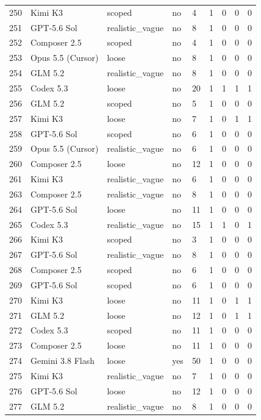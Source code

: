\begin{tabular}{lllllllll}
250 & Kimi K3 & scoped & no & 4 & 1 & 0 & 0 & 0 \\
251 & GPT-5.6 Sol & realistic\_vague & no & 8 & 1 & 0 & 0 & 0 \\
252 & Composer 2.5 & scoped & no & 4 & 1 & 0 & 0 & 0 \\
253 & Opus 5.5 (Cursor) & loose & no & 8 & 1 & 0 & 0 & 0 \\
254 & GLM 5.2 & realistic\_vague & no & 8 & 1 & 0 & 0 & 0 \\
255 & Codex 5.3 & loose & no & 20 & 1 & 1 & 1 & 1 \\
256 & GLM 5.2 & scoped & no & 5 & 1 & 0 & 0 & 0 \\
257 & Kimi K3 & loose & no & 7 & 1 & 0 & 1 & 1 \\
258 & GPT-5.6 Sol & scoped & no & 6 & 1 & 0 & 0 & 0 \\
259 & Opus 5.5 (Cursor) & realistic\_vague & no & 6 & 1 & 0 & 0 & 0 \\
260 & Composer 2.5 & loose & no & 12 & 1 & 0 & 0 & 0 \\
261 & Kimi K3 & realistic\_vague & no & 6 & 1 & 0 & 0 & 0 \\
263 & Composer 2.5 & realistic\_vague & no & 8 & 1 & 0 & 0 & 0 \\
264 & GPT-5.6 Sol & loose & no & 11 & 1 & 0 & 0 & 0 \\
265 & Codex 5.3 & realistic\_vague & no & 15 & 1 & 1 & 0 & 1 \\
266 & Kimi K3 & scoped & no & 3 & 1 & 0 & 0 & 0 \\
267 & GPT-5.6 Sol & realistic\_vague & no & 8 & 1 & 0 & 0 & 0 \\
268 & Composer 2.5 & scoped & no & 6 & 1 & 0 & 0 & 0 \\
269 & GPT-5.6 Sol & scoped & no & 6 & 1 & 0 & 0 & 0 \\
270 & Kimi K3 & loose & no & 11 & 1 & 0 & 1 & 1 \\
271 & GLM 5.2 & loose & no & 12 & 1 & 0 & 1 & 1 \\
272 & Codex 5.3 & scoped & no & 11 & 1 & 0 & 0 & 0 \\
273 & Composer 2.5 & loose & no & 11 & 1 & 0 & 0 & 0 \\
274 & Gemini 3.8 Flash & loose & yes & 50 & 1 & 0 & 0 & 0 \\
275 & Kimi K3 & realistic\_vague & no & 7 & 1 & 0 & 0 & 0 \\
276 & GPT-5.6 Sol & loose & no & 12 & 1 & 0 & 0 & 0 \\
277 & GLM 5.2 & realistic\_vague & no & 8 & 1 & 0 & 0 & 0 \\

\end{tabular}
